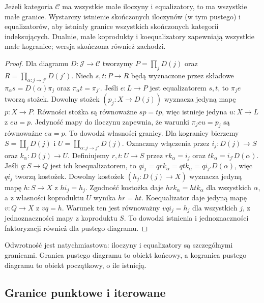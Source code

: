 \begin{twierdzenie}\label{cat:thm:limits-products}
Jeżeli kategoria $\mathcal C$ ma wszystkie małe iloczyny i equalizatory, to ma wszystkie małe granice. Wystarczy istnienie skończonych iloczynów (w tym pustego) i equalizatorów, aby istniały granice wszystkich skończonych kategorii indeksujących. Dualnie, małe koprodukty i koequalizatory zapewniają wszystkie małe kogranice; wersja skończona również zachodzi.
\end{twierdzenie}
\begin{proof}
Dla diagramu $D:\mathcal J\to\mathcal C$ tworzymy
$P=\prod_jD(j)$ oraz $R=\prod_{\alpha:j\to j'}D(j')$.
Niech $s,t:P\to R$ będą wyznaczone przez składowe
$\pi_\alpha s=D(\alpha)\pi_j$ oraz $\pi_\alpha t=\pi_{j'}$.
Jeśli $e:L\to P$ jest equalizatorem $s,t$, to $\pi_je$ tworzą stożek. Dowolny stożek $(p_j:X\to D(j))$ wyznacza jedyną mapę $p:X\to P$. Równości stożka są równoważne $sp=tp$, więc istnieje jedyna $u:X\to L$ z $eu=p$. Jedyność mapy do iloczynu zapewnia, że warunki $\pi_jeu=p_j$ są równoważne $eu=p$. To dowodzi własności granicy. Dla kogranicy bierzemy $S=\coprod_jD(j)$ i $U=\coprod_{\alpha:j\to j'}D(j)$. Oznaczmy włączenia przez $i_j:D(j)\to S$ oraz $k_\alpha:D(j)\to U$. Definiujemy $r,t:U\to S$ przez $rk_\alpha=i_j$ oraz $tk_\alpha=i_{j'}D(\alpha)$. Jeśli $q:S\to Q$ jest ich koequalizatorem, to $qi_j=qrk_\alpha=qtk_\alpha=qi_{j'}D(\alpha)$, więc $qi_j$ tworzą kostożek. Dowolny kostożek $(h_j:D(j)\to X)$ wyznacza jedyną mapę $h:S\to X$ z $hi_j=h_j$. Zgodność kostożka daje $hrk_\alpha=htk_\alpha$ dla wszystkich $\alpha$, a z własności koproduktu $U$ wynika $hr=ht$. Koequalizator daje jedyną mapę $v:Q\to X$ z $vq=h$. Warunek ten jest równoważny $vqi_j=h_j$ dla wszystkich $j$, z jednoznaczności mapy z koproduktu $S$. To dowodzi istnienia i jednoznaczności faktoryzacji również dla pustego diagramu.
\end{proof}

\begin{uwaga}
Odwrotność jest natychmiastowa: iloczyny i equalizatory są szczególnymi granicami. Granica pustego diagramu to obiekt końcowy, a kogranica pustego diagramu to obiekt początkowy, o ile istnieją.
\end{uwaga}

\subsection{Granice punktowe i iterowane}

